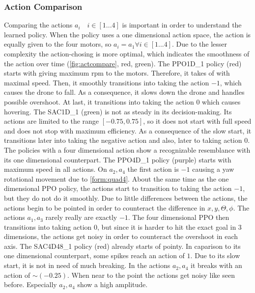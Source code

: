 \subsubsection{Action Comparison}
Comparing the actions $a_i \quad i \in [1...4]$ is important in order to understand
the learned policy.
When the policy uses a one dimensional action space, the action is equally given
to the four motors, so $a_i = a_1 \forall i \in [1...4]$.
Due to the lesser complexity the action-chosing is more optimal, which
indicates the smoothness of the action over time (\cref{fig:actcompare}, red, green).
The PPO1D\_1 policy (red) starts with giving maximum rpm to the motors.
Therefore, it takes of with maximal speed. Then, it smoothly transitions
into taking the action $-1$, which causes the drone to fall. As a consequence,
it slows down the drone and handles possible overshoot. At last, it transitions
into taking the action $0$ which causes hovering.
The SAC1D\_1 (green) is not as steady in its decision-making. Its actions are 
limited to the range $[-0.75, 0.75]$, so it does not start with full speed
and does not stop with maximum efficiency. As a consequence of the
slow start, it transitions later into taking the negative action and also, later
to taking action $0$.
The policies with a four dimensional action show a recognizable resemblance with 
its one dimensional counterpart.
The PPO4D\_1 policy (purple) starts with maximum speed in all actions.
On $a_2, a_4$ the first action is $-1$ causing a yaw rotational movement due to 
\cref{form:quad4}. About the same time as the one dimensional PPO policy,
the actions start to transition to taking the action $-1$, but they do not do it smoothly.
Due to little differences between the actions, the actions begin to be pointed
in order to counteract the difference in $x, y, \Theta, \phi$. 
The actions $a_1, a_3$ rarely really are exactly $-1$. The four dimensional
PPO then transitions into taking action $0$, but since it is harder to hit 
the exact goal in 3 dimensions, the actions get noisy in order to counteract
the overshoot in each axis.
The SAC4D48\_1 policy (red) already starts of pointy. In caparison to its
one dimensional counterpart, some spikes reach an action of $1$.
Due to its slow start, it is not in need of much breaking.
In the actions $a_2, a_4$ it breaks with an action of $\sim (-0.25)$. 
When near to the point the actions get noisy like seen before. Especially
$a_2, a_4$ show a high amplitude. 

